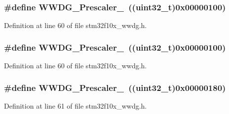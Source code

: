 \subsubsection[{\texorpdfstring{W\+W\+D\+G\+\_\+\+Prescaler\+\_\+4}{WWDG_Prescaler_4}}]{\setlength{\rightskip}{0pt plus 5cm}\#define W\+W\+D\+G\+\_\+\+Prescaler\+\_~(({\bf uint32\+\_\+t})0x00000100)}\hypertarget{group___w_w_d_g___prescaler_gab11714e1816967802a8421587e54a2eb}{}\label{group___w_w_d_g___prescaler_gab11714e1816967802a8421587e54a2eb}


Definition at line 60 of file stm32f10x\+\_\+wwdg.\+h.

\subsubsection[{\texorpdfstring{W\+W\+D\+G\+\_\+\+Prescaler\+\_\+4}{WWDG_Prescaler_4}}]{\setlength{\rightskip}{0pt plus 5cm}\#define W\+W\+D\+G\+\_\+\+Prescaler\+\_~(({\bf uint32\+\_\+t})0x00000100)}\hypertarget{group___w_w_d_g___prescaler_gab11714e1816967802a8421587e54a2eb}{}\label{group___w_w_d_g___prescaler_gab11714e1816967802a8421587e54a2eb}


Definition at line 60 of file stm32f10x\+\_\+wwdg.\+h.

\subsubsection[{\texorpdfstring{W\+W\+D\+G\+\_\+\+Prescaler\+\_\+8}{WWDG_Prescaler_8}}]{\setlength{\rightskip}{0pt plus 5cm}\#define W\+W\+D\+G\+\_\+\+Prescaler\+\_~(({\bf uint32\+\_\+t})0x00000180)}\hypertarget{group___w_w_d_g___prescaler_ga7a4933366603869726bd5ea547d99f02}{}\label{group___w_w_d_g___prescaler_ga7a4933366603869726bd5ea547d99f02}


Definition at line 61 of file stm32f10x\+\_\+wwdg.\+h.

